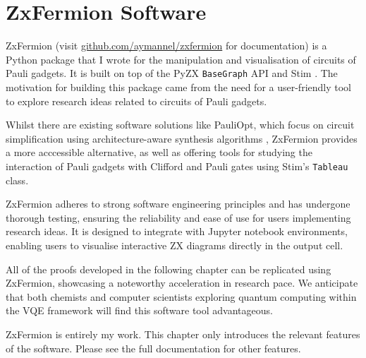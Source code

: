 \chapter{ZxFermion Software}

ZxFermion (visit \href{https://github.com/aymannel/zxfermion}{github.com/aymannel/zxfermion} for documentation) is a Python package that I wrote for the manipulation and visualisation of circuits of Pauli gadgets. It is built on top of the PyZX \lstinline{BaseGraph} API \cite{Kissinger2020} and Stim \cite{Gidney2021}. The motivation for building this package came from the need for a user-friendly tool to explore research ideas related to circuits of Pauli gadgets.

Whilst there are existing software solutions like PauliOpt, which focus on circuit simplification using architecture-aware synthesis algorithms \cite{Gogioso2023}, ZxFermion provides a more acccessible alternative, as well as offering tools for studying the interaction of Pauli gadgets with Clifford and Pauli gates using Stim's \lstinline{Tableau} class.

ZxFermion adheres to strong software engineering principles and has undergone thorough testing, ensuring the reliability and ease of use for users implementing research ideas. It is designed to integrate with Jupyter notebook environments, enabling users to visualise interactive ZX diagrams directly in the output cell.

All of the proofs developed in the following chapter can be replicated using ZxFermion, showcasing a noteworthy acceleration in research pace. We anticipate that both chemists and computer scientists exploring quantum computing within the VQE framework will find this software tool advantageous.

ZxFermion is entirely my work. This chapter only introduces the relevant features of the software. Please see the full documentation for other features.
